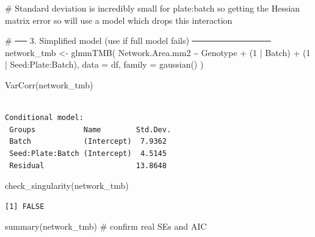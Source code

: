 \documentclass[
  letterpaper,
  DIV=11,
  numbers=noendperiod]{scrartcl}
\newenvironment{Shaded}{\begin{snugshade}}{\end{snugshade}}
\newcommand{\AttributeTok}[1]{\textcolor[rgb]{0.40,0.45,0.13}{#1}}
\newcommand{\CommentTok}[1]{\textcolor[rgb]{0.37,0.37,0.37}{#1}}
\newcommand{\DecValTok}[1]{\textcolor[rgb]{0.68,0.00,0.00}{#1}}
\newcommand{\FunctionTok}[1]{\textcolor[rgb]{0.28,0.35,0.67}{#1}}
\newcommand{\NormalTok}[1]{\textcolor[rgb]{0.00,0.23,0.31}{#1}}
\newcommand{\OtherTok}[1]{\textcolor[rgb]{0.00,0.23,0.31}{#1}}
\newcommand{\SpecialCharTok}[1]{\textcolor[rgb]{0.37,0.37,0.37}{#1}}
\begin{document}
\begin{Shaded}
\begin{Highlighting}[]
\CommentTok{\# Standard deviation is incredibly small for plate:batch so getting the Hessian matrix error so will use a model which drops this interaction}


\CommentTok{\# ── 3. Simplified model (use if full model fails) ─────────────}
\NormalTok{network\_tmb }\OtherTok{\textless{}{-}} \FunctionTok{glmmTMB}\NormalTok{(}
\NormalTok{  Network.Area.mm2 }\SpecialCharTok{\textasciitilde{}}\NormalTok{ Genotype }\SpecialCharTok{+}\NormalTok{ (}\DecValTok{1} \SpecialCharTok{|}\NormalTok{ Batch) }\SpecialCharTok{+}\NormalTok{ (}\DecValTok{1} \SpecialCharTok{|}\NormalTok{ Seed}\SpecialCharTok{:}\NormalTok{Plate}\SpecialCharTok{:}\NormalTok{Batch),}
  \AttributeTok{data =}\NormalTok{ df, }\AttributeTok{family =} \FunctionTok{gaussian}\NormalTok{()}
\NormalTok{)}

\FunctionTok{VarCorr}\NormalTok{(network\_tmb)}
\end{Highlighting}
\end{Shaded}

\begin{verbatim}

Conditional model:
 Groups           Name        Std.Dev.
 Batch            (Intercept)  7.9362 
 Seed:Plate:Batch (Intercept)  4.5145 
 Residual                     13.8648 
\end{verbatim}

\begin{Shaded}
\begin{Highlighting}[]
\FunctionTok{check\_singularity}\NormalTok{(network\_tmb)}
\end{Highlighting}
\end{Shaded}

\begin{verbatim}
[1] FALSE
\end{verbatim}

\begin{Shaded}
\begin{Highlighting}[]
\FunctionTok{summary}\NormalTok{(network\_tmb)   }\CommentTok{\# confirm real SEs and AIC}
\end{Highlighting}
\end{Shaded}
\end{document}
